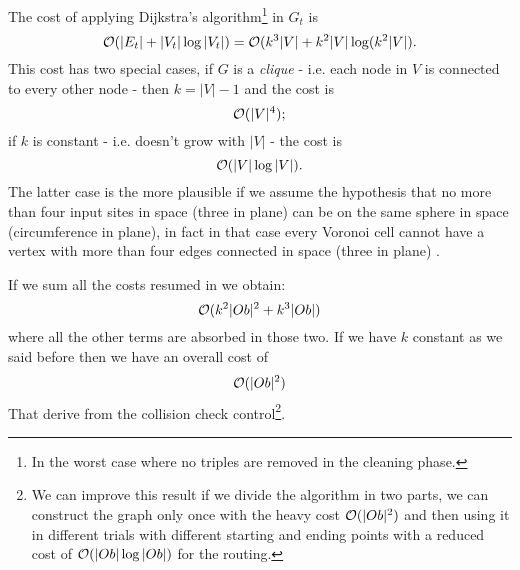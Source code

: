 \documentclass[dissertation.tex]{subfiles}
\begin{document}
The cost of applying Dijkstra's algorithm\footnote{In the worst case
  where no triples are removed in the cleaning phase.} in $G_t$ is
\newcommand{\eqCostDijkstraTriples}{\ensuremath{\bigO(k^3|V|+k^2|V|\log(k^2|V|)}}
\begin{equation}
  \label{eq:costDijkstraTriples}
  \bigO(|E_t|+|V_t|\log |V_t|) = \eqCostDijkstraTriples .
\end{equation}
This cost has two special cases, if $G$ is a \emph{clique} - i.e. each
node in $V$ is connected to every other node \cite{bondy} - then $k=|V|-1$ and the
cost is
\begin{equation*}
  \mathcal{O}(|V|^4);
\end{equation*}
if $k$ is constant - i.e. doesn't grow with $|V|$ - the
cost is
\begin{equation*}
  \mathcal{O}(|V|\log|V|).
\end{equation*}
The latter case is the more plausible if we assume the hypothesis that
no more than four input sites in space (three in plane) can be on the
same sphere in space (circumference in plane), in fact in that case
every Voronoi cell cannot have a vertex with more than four edges
connected in space (three in plane) \cite{deberg}.

If we sum all the costs resumed in we obtain:
\newcommand{\eqCostTotalOne}{\ensuremath{\bigO(k^2|Ob|^2+k^3|Ob|)}}
\begin{equation}\label{eq:costTotalOne}
  \eqCostTotalOne
\end{equation}
where all the other terms are absorbed in those two. If we have $k$
constant as we said before then we have an overall cost of
\newcommand{\eqCostTotalOneK}{\ensuremath{\bigO(|Ob|^2)}}
\begin{equation}\label{eq:costTotalOneK}
  \eqCostTotalOneK
\end{equation}
That derive from the collision check control\footnote{We can improve
  this result if we divide the algorithm in two parts, we 
can construct the graph only once with the heavy cost $\mathcal{O}(|Ob|^2)$
and then using
it in different trials with different starting and ending points with
a reduced cost of $\mathcal{O}(|Ob|\log |Ob|)$
for the routing.}.
\end{document}
